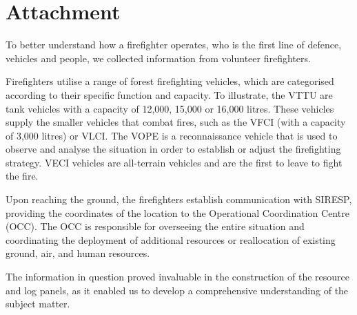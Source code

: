\section{Attachment}
To better understand how a firefighter operates, who is the first line of defence, vehicles and people, we collected information from volunteer firefighters. \par
Firefighters utilise a range of forest firefighting vehicles, which are categorised according to their specific function and capacity. To illustrate, the VTTU are tank vehicles with a capacity of 12,000, 15,000 or 16,000 litres. These vehicles supply the smaller vehicles that combat fires, such as the VFCI (with a capacity of 3,000 litres) or VLCI. The VOPE is a reconnaissance vehicle that is used to observe and analyse the situation in order to establish or adjust the firefighting strategy. VECI vehicles are all-terrain vehicles and are the first to leave to fight the fire. \par
Upon reaching the ground, the firefighters establish communication with SIRESP, providing the coordinates of the location to the Operational Coordination Centre (OCC). The OCC is responsible for overseeing the entire situation and coordinating the deployment of additional resources or reallocation of existing ground, air, and human resources. \par
The information in question proved invaluable in the construction of the resource and log panels, as it enabled us to develop a comprehensive understanding of the subject matter.

